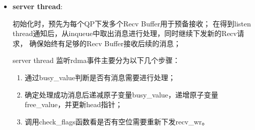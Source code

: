 {\begin{itemize}
              listen thread的伪代码如算法~\ref{alg:listenRDMA-thread}所示。
              \begin{algorithm}
                  \caption{listen thread algorithm}\label{alg:listenRDMA-thread}
                  \begin{algorithmic}[1] %
                      \State {}
                      \State \textbf{return} NULL
                      \EndProcedure

                      \State $\{ cq\_ptr, context\} \gets$ 
                      \State $inqueue \gets (rdma\_connect\_t)context.inqueue$
                      \State {}
                      \State $wc \gets$ 

                      \State
                      \State {}
                      \Else
                      \State {}
                      \State {}

                      \State
                      \State $connect\_array[inqueue$->$queue[inqueue$->$tail]$->$topid].rcv\_seq $++
                      \State $inqueue$->$tail \gets (inqueue$->$tail$+1$) \% QueueSize$
                      \EndIf
                      \EndWhile

                      \State
                      \State {}
                      \State \textbf{return}
                      \EndFunction
                  \end{algorithmic}
              \end{algorithm}
        \item \textbf{server thread}:

              初始化时，预先为每个QP下发多个Recv Buffer用于预备接收；
              在得到listen thread通知后，从inqueue中取出消息进行处理，同时继续下发新的Recv请求，
              确保始终有足够的Recv Buffer接收后续的消息；

              server thread 监听rdma事件主要分为以下几个步骤：
              \begin{enumerate}[leftmargin=*, nosep]
                  \item 通过busy\_value判断是否有消息需要进行处理；
                  \item 确定处理成功消息后递减原子变量busy\_value，递增原子变量free\_value，并更新head指针；
                  \item 调用check\_flags函数看是否有空位需要重新下发recv\_wr。
              \end{enumerate}


\end{itemize}}
